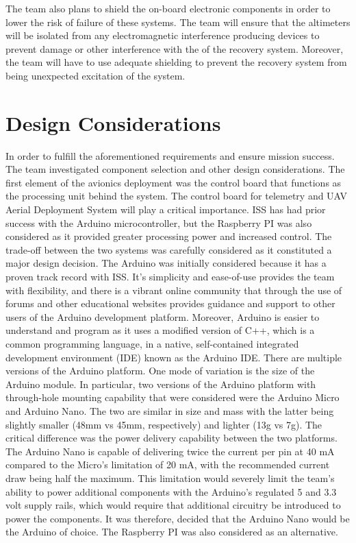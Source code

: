The team also plans to shield the on-board electronic components in order to lower the risk of failure of these systems. The team will ensure that the altimeters will be isolated from any electromagnetic interference producing devices to prevent damage or other interference with the of the recovery system. Moreover, the team will have to use adequate shielding to prevent the recovery system from being unexpected excitation of the system.

\section{Design Considerations}

In order to fulfill the aforementioned requirements and ensure mission success. The team investigated component selection and other design considerations. The first element of the avionics deployment was the control board that functions as the processing unit behind the system.
The control board for telemetry and UAV Aerial Deployment System will play a critical importance. ISS has had prior success with the Arduino microcontroller, but the Raspberry PI was also considered as it provided greater processing power and increased control. The trade-off between the two systems was carefully considered as it constituted a major design decision. 
	The Arduino was initially considered because it has a proven track record with ISS. It’s simplicity and ease-of-use provides the team with flexibility, and there is a vibrant online community that through the use of forums and other educational websites provides guidance and support to other users of the Arduino development platform. Moreover, Arduino is easier to understand and program as it uses a modified version of C++, which is a common programming language, in a native, self-contained integrated development environment (IDE) known as the Arduino IDE. 
	There are multiple versions of the Arduino platform. One mode of variation is the size of the Arduino module. In particular, two versions of the Arduino platform with through-hole mounting capability that were considered were the Arduino Micro and Arduino Nano. The two are similar in size and mass with the latter being slightly smaller (48mm vs 45mm, respectively) and lighter (13g vs 7g). The critical difference was the power delivery capability between the two platforms. The Arduino Nano is capable of delivering twice the current per pin at 40 mA compared to the Micro’s limitation of 20 mA, with the recommended current draw being half the maximum. This limitation would severely limit the team’s ability to power additional components with the Arduino’s regulated 5 and 3.3 volt supply rails, which would require that additional circuitry be introduced to power the components. It was therefore, decided that the Arduino Nano would be the Arduino of choice. The Raspberry PI was also considered as an alternative. \\\\
